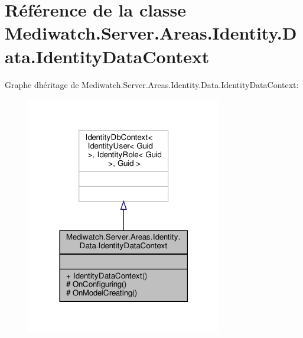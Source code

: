 \hypertarget{class_mediwatch_1_1_server_1_1_areas_1_1_identity_1_1_data_1_1_identity_data_context}{}\section{Référence de la classe Mediwatch.\+Server.\+Areas.\+Identity.\+Data.\+Identity\+Data\+Context}
\label{class_mediwatch_1_1_server_1_1_areas_1_1_identity_1_1_data_1_1_identity_data_context}


Graphe d\textquotesingle{}héritage de Mediwatch.\+Server.\+Areas.\+Identity.\+Data.\+Identity\+Data\+Context\+:\nopagebreak
\begin{figure}[H]
\begin{center}
\leavevmode
\includegraphics[width=242pt]{class_mediwatch_1_1_server_1_1_areas_1_1_identity_1_1_data_1_1_identity_data_context__inherit__graph}
\end{center}
\end{figure}


